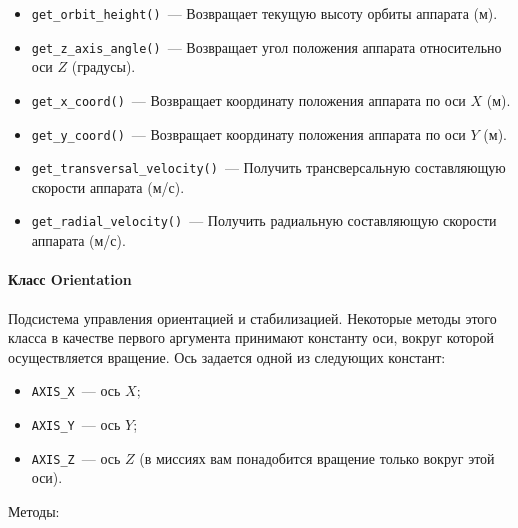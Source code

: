 \documentclass[12pt,a4paper]{article}
\begin{document}
\begin{itemize}
\item \verb'get_orbit_height()'~--- Возвращает текущую высоту орбиты аппарата (м).
\item \verb'get_z_axis_angle()'~--- Возвращает угол положения аппарата относительно оси $Z$ (градусы).
\item \verb'get_x_coord()'~--- Возвращает координату положения аппарата по оси $X$ (м).
\item \verb'get_y_coord()'~--- Возвращает координату положения аппарата по оси $Y$ (м).
\item \verb'get_transversal_velocity()'~--- Получить трансверсальную составляющую скорости аппарата (м/с).
\item \verb'get_radial_velocity()'~--- Получить радиальную составляющую скорости аппарата (м/с).
\end{itemize}

\paragraph{Класс Orientation}

Подсистема управления ориентацией и стабилизацией. Некоторые методы этого класса в
качестве первого аргумента принимают константу оси, вокруг которой осуществляется
вращение. Ось задается одной из следующих констант:

\begin{itemize}
\item \verb'AXIS_X'~--- ось $X$;
\item \verb'AXIS_Y'~--- ось $Y$;
\item \verb'AXIS_Z'~--- ось $Z$ (в миссиях вам понадобится вращение только вокруг этой оси).
\end{itemize}

Методы:
   
\end{document}
